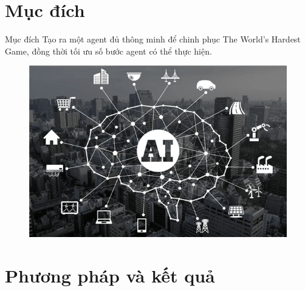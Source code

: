 \documentclass{beamer}
\begin{document}
\section{Mục đích}
\begin{frame}{Mục đích}
Tạo ra một agent đủ thông minh để chinh phục The World's Hardest Game, đồng thời tối ưu số bước agent có thể thực hiện.
\begin{figure}
	\centering
	\includegraphics[scale=0.4]{Pic/slide/best-ai.png}
	\captionsetup{labelformat=empty}
\end{figure}
\end{frame}
\section{Phương pháp và kết quả}
\end{document}
